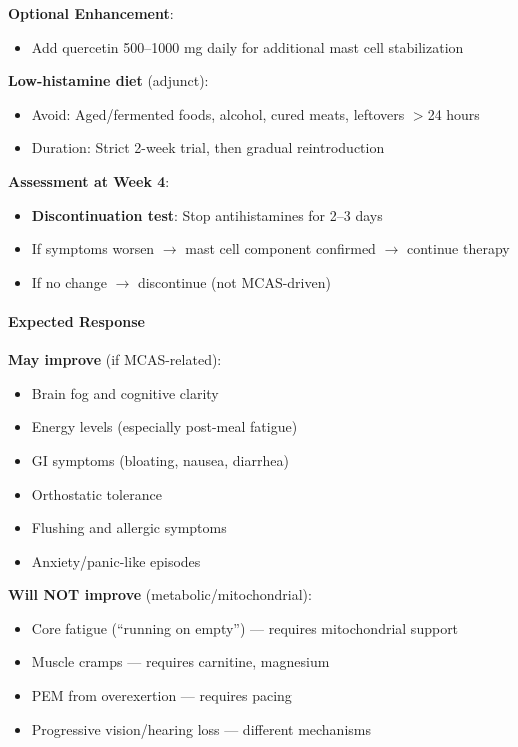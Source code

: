 \textbf{Optional Enhancement}:
\begin{itemize}
    \item Add quercetin 500--1000 mg daily for additional mast cell stabilization
\end{itemize}

\textbf{Low-histamine diet} (adjunct):
\begin{itemize}
    \item Avoid: Aged/fermented foods, alcohol, cured meats, leftovers $>$24 hours
    \item Duration: Strict 2-week trial, then gradual reintroduction
\end{itemize}

\textbf{Assessment at Week 4}:
\begin{itemize}
    \item \textbf{Discontinuation test}: Stop antihistamines for 2--3 days
    \item If symptoms worsen $\to$ mast cell component confirmed $\to$ continue therapy
    \item If no change $\to$ discontinue (not MCAS-driven)
\end{itemize}

\paragraph{Expected Response}

\textbf{May improve} (if MCAS-related):
\begin{itemize}
    \item Brain fog and cognitive clarity
    \item Energy levels (especially post-meal fatigue)
    \item GI symptoms (bloating, nausea, diarrhea)
    \item Orthostatic tolerance
    \item Flushing and allergic symptoms
    \item Anxiety/panic-like episodes
\end{itemize}

\textbf{Will NOT improve} (metabolic/mitochondrial):
\begin{itemize}
    \item Core fatigue (``running on empty'') --- requires mitochondrial support
    \item Muscle cramps --- requires carnitine, magnesium
    \item PEM from overexertion --- requires pacing
    \item Progressive vision/hearing loss --- different mechanisms
\end{itemize}

